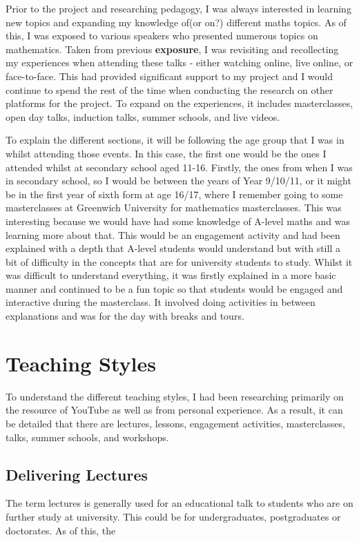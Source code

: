 \documentclass[12pt, a4paper,oneside]{book}
\numberwithin{equation}{section}
\begin{document}
Prior to the project and researching pedagogy, I was always interested in learning new topics and expanding my knowledge of(or on?) different maths topics. As of this, I was exposed to various speakers who presented numerous topics on mathematics. Taken from previous {\color{red}\textbf{exposure}}, I was revisiting and recollecting my experiences when attending these talks - either watching online, live online, or face-to-face. This had provided significant support to my project and I would continue to spend the rest of the time when conducting the research on other platforms for the project. To expand on the experiences, it includes masterclasses, open day talks, induction talks, summer schools, and live videos.

To explain the different sections, it will be following the age group that I was in whilst attending those events. In this case, the first one would be the ones I attended whilst at secondary school aged 11-16. Firstly, the ones from when I was in secondary school, so I would be between the years of Year 9/10/11, or it might be in the first year of sixth form at age 16/17, where I remember going to some masterclasses at Greenwich University for mathematics masterclasses. This was interesting because we would have had some knowledge of A-level maths and was learning more about that. This would be an engagement activity and had been explained with a depth that A-level students would understand but with still a bit of difficulty in the concepts that are for university students to study. Whilst it was difficult to understand everything, it was firstly explained in a more basic manner and continued to be a fun topic so that students would be engaged and interactive during the masterclass. It involved doing activities in between explanations and was for the day with breaks and tours.



\section{Teaching Styles}\label{sec:2.1}

To understand the different teaching styles, I had been researching primarily on the resource of YouTube as well as from personal experience. As a result, it can be detailed that there are lectures, lessons, engagement activities, masterclasses, talks, summer schools, and workshops.

\subsection{Delivering Lectures}
The term lectures is generally used for an educational talk to students who are on further study at university. This could be for undergraduates, postgraduates or doctorates. As of this, the
\end{document}
